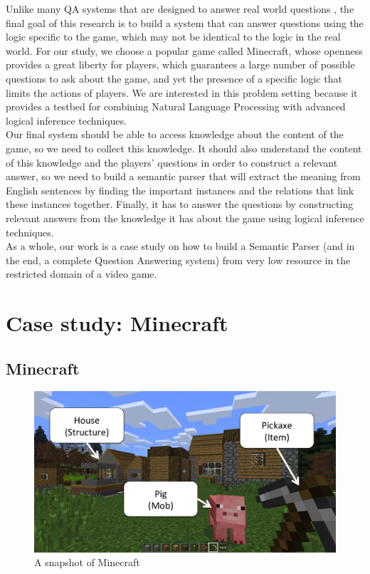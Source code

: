 \documentclass[12pt]{article}
\begin{document}
Unlike many QA systems that are designed to answer real world questions \cite{berant2014semantic,yao2015lean}, the final goal of this research is to build a system that can answer questions using the logic specific to the game, which may not be identical to the logic in the real world. For our study, we choose a popular game called Minecraft, whose openness provides a great liberty for players, which guarantees a large number of possible questions to ask about the game, and yet the presence of a specific logic that limits the actions of players. We are interested in this problem setting because it provides a testbed for combining Natural Language Processing with advanced logical inference techniques.\\
Our final system should be able to access knowledge about the content of the game, so we need to collect this knowledge.
It should also understand the content of this knowledge and the players' questions in order to construct a relevant answer, so we need to build a semantic parser that will extract the meaning from English sentences by finding the important instances and the relations that link these instances together.
Finally, it has to answer the questions by constructing relevant answers from the knowledge it has about the game using logical inference techniques.\\
As a whole, our work is a case study on how to build a Semantic Parser (and in the end, a complete Question Answering system) from very low resource in the restricted domain of a video game.

\newpage
\section{Case study: Minecraft}

\subsection{Minecraft}

\begin{figure}[!ht]
	\centering \includegraphics[width=0.7\linewidth]{Figures/Minecraft/minecraft.png}
	\caption{\label{minecraftPicture}A snapshot of Minecraft}
\end{figure}
\end{document}
